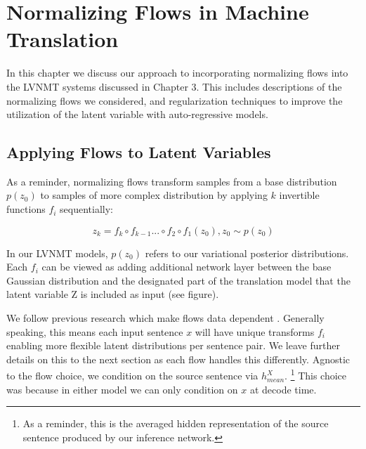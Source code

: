 \chapter{Normalizing Flows in Machine Translation}


In this chapter we discuss our approach to incorporating normalizing flows into the \ac{LVNMT} systems discussed in Chapter 3. This includes descriptions of the normalizing flows we considered, and regularization techniques to improve the utilization of the latent variable with auto-regressive models.
\section{Applying Flows to Latent Variables}


As a reminder, normalizing flows transform samples from a base distribution $p(z_{0})$ to samples of more complex distribution by applying $k$ invertible functions $f_{i}$ sequentially: 

\begin{equation}
z_{k} = f_{k} \circ f_{k-1} ... \circ f_{2} \circ f_{1}(z_{0}) , z_{0} \sim p(z_{0})
\end{equation}

In our \ac{LVNMT} models, $p(z_{0})$ refers to our variational posterior distributions. Each $f_{i}$ can be viewed as adding additional network layer between the base Gaussian distribution and the designated part of the translation model that the latent variable Z is included as input (see figure).

We follow previous research which make flows data dependent \cite{rezende2015VIwithNF,Berg2018SylvesterNF,kingma2016IAF,tomczak2016Householder}.  Generally speaking, this means each input sentence $x$ will have unique transforms $f_{i}$ enabling more flexible latent distributions per sentence pair. We leave further details on this to the next section as each flow handles this differently. Agnostic to the flow choice, we condition on the source sentence via $h_{mean}^{X}$. \footnote{As a reminder, this is the averaged hidden representation of the source sentence produced by our inference network.} This choice was because in either model we can only condition on $x$ at decode time.

